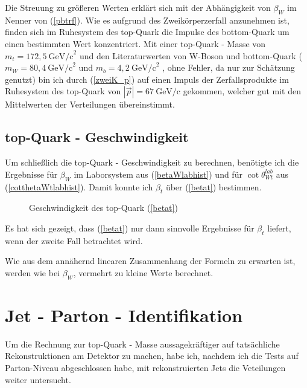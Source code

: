 \documentclass[
a4paper,                                %
twoside,                                %
BCOR1.4cm,                      %
ngerman,                                %
10pt,                           %
headings=normal,                %
headsepline,                    %
clearplainpage, %
final,                                  %
div=14,
parskip=full
]{scrbook}
\begin{document}
Die Streuung zu gr\"o\ss eren Werten erkl\"art sich mit der Abh\"angigkeit von $ \beta_{W} $ im Nenner von (\ref{pbtrf}). Wie es aufgrund des Zweik\"orperzerfall anzunehmen ist, finden sich im Ruhesystem des top-Quark die Impulse des bottom-Quark um einen bestimmten Wert konzentriert. Mit einer top-Quark - Masse von $ m_{t} = 172{,}5\ \text{GeV}\text{/c}^{2} $ und den Literaturwerten von W-Boson und bottom-Quark ($ m_{W} = 80{,}4\ \text{GeV}\text{/c}^{2} $ und $ m_{b} = 4{,}2\ \text{GeV}\text{/c}^{2} $ \cite{RPP}, ohne Fehler, da nur zur Sch\"atzung genutzt) bin ich durch (\ref{zweiK_p}) auf einen Impuls der Zerfallsprodukte im Ruhesystem des top-Quark von $ |\vec{p}| = 67\ \text{GeV/c} $ gekommen, welcher gut mit den Mittelwerten der Verteilungen \"ubereinstimmt.

\newpage

\subsection{top-Quark - Geschwindigkeit}\label{betattest}

Um schlie\ss lich die top-Quark - Geschwindigkeit zu berechnen, ben\"otigte ich die Ergebnisse f\"ur $ \beta_{W} $ im Laborsystem aus (\ref{betaWlabhist}) und f\"ur $ \cot \theta_{Wt}^{lab} $ aus (\ref{cotthetaWtlabhist}). Damit konnte ich $ \beta_{t} $ \"uber (\ref{betat}) bestimmen.

\begin{figure}[h]
    \caption{Geschwindigkeit des top-Quark (\ref{betat})}
\end{figure}

Es hat sich gezeigt, dass (\ref{betat}) nur dann sinnvolle Ergebnisse f\"ur $ \beta_{t} $ liefert, wenn der zweite Fall betrachtet wird.

Wie aus dem ann\"ahernd linearen Zusammenhang der Formeln zu erwarten ist, werden wie bei $ \beta_{W} $, vermehrt zu kleine Werte berechnet.

\section{Jet - Parton - Identifikation}

Um die Rechnung zur top-Quark - Masse aussagekr\"aftiger auf tats\"achliche Rekonstruktionen am Detektor zu machen, habe ich, nachdem ich die Tests auf Parton-Niveau abgeschlossen habe, mit rekonstruierten Jets die Veteilungen weiter untersucht.
\end{document}
